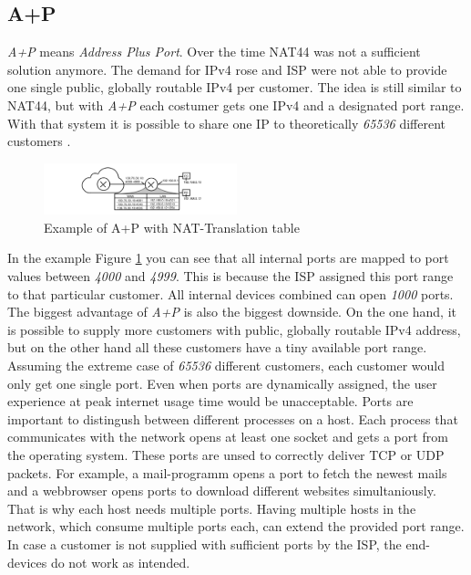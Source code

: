 \documentclass[format=sigconf, natbib=true, nonacm=true]{acmart}
\begin{document}
    \subsection{A+P}
    \textit{A+P} means \textit{Address Plus Port}. Over the time NAT44 was not a sufficient solution anymore. The demand for IPv4 rose and ISP were not able to provide one single public, globally routable IPv4 per customer. The idea is still similar to NAT44, but with \textit{A+P} each costumer gets one IPv4 and a designated port range. With that system it is possible to share one IP to theoretically \textit{65536} different customers \cite{8716482}.
    \begin{figure}
        \centering
        \includegraphics[width=0.5\textwidth]{images/a_plus_p.png}
        \caption{Example of A+P with NAT-Translation table}
        \label{fig:a_plus_p}
    \end{figure}
    In the example Figure \ref{fig:a_plus_p} you can see that all internal ports are mapped to port values between \textit{4000} and \textit{4999}. This is because the ISP assigned this port range to that particular customer. All internal devices combined can open \textit{1000} ports. The biggest advantage of \textit{A+P} is also the biggest downside. On the one hand, it is possible to supply more customers with public, globally routable IPv4 address, but on the other hand all these customers have a tiny available port range. Assuming the extreme case of \textit{65536} different customers, each customer would only get one single port. Even when ports are dynamically assigned, the user experience at peak internet usage time would be unacceptable. Ports are important to distingush between different processes on a host. Each process that communicates with the network opens at least one socket and gets a port from the operating system. These ports are unsed to correctly deliver TCP or UDP packets. For example, a mail-programm opens a port to fetch the newest mails and a webbrowser opens ports to download different websites simultaniously. That is why each host needs multiple ports. Having multiple hosts in the network, which consume multiple ports each, can extend the provided port range. In case a customer is not supplied with sufficient ports by the ISP, the end-devices do not work as intended. 
\end{document}
